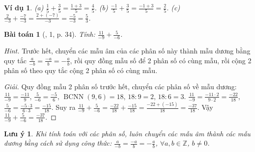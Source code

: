 \documentclass{article}
\newtheorem{baitoan}{Bài toán}
\newtheorem{luuy}{Lưu ý}
\newtheorem{vidu}{Ví dụ}
\begin{document}
\begin{vidu}
	(a) $\frac{1}{5} + \frac{3}{5} = \frac{1 + 3}{5} = \frac{4}{5}$. (b) $\frac{-1}{5} + \frac{3}{5} = \frac{-1 + 3}{5} = \frac{2}{5}$. (c) $\frac{2}{-3} + \frac{-7}{-3} = \frac{2 + (-7)}{-3} = \frac{-5}{-3} = \frac{5}{3}$.
\end{vidu}

\begin{baitoan}[\cite{SGK_Toan_6_Canh_Dieu_tap_2}, 1, p. 34]
	Tính: $\frac{11}{-9} + \frac{5}{-6}$.
\end{baitoan}
\noindent\textit{Hint.} Trước hết, chuyển các mẫu âm của các phân số này thành mẫu dương bằng quy tắc $\frac{a}{-b} = \frac{-a}{b} = -\frac{a}{b}$, rồi quy đồng mẫu số để 2 phân số có cùng mẫu, rồi cộng 2 phân số theo quy tắc cộng 2 phân số có cùng mẫu.

\begin{proof}[Giải]
	Quy đồng mẫu 2 phân số trước hết, chuyển các phân số về mẫu dương: $\frac{11}{-9} = \frac{-11}{9}$, $\frac{5}{-6} = \frac{-5}{6}$, $\operatorname{BCNN}(9,6) = 18$, $18:9 = 2$, $18:6 = 3$. $\frac{11}{-9} = \frac{-11\cdot2}{9\cdot2} = \frac{-22}{18}$, $\frac{5}{-6} = \frac{-5\cdot3}{6\cdot3} = \frac{-15}{18}$. Suy ra $\frac{11}{-9} + \frac{5}{-6} = \frac{-22}{18} + \frac{-15}{18} = \frac{-22 + (-15)}{18} = \frac{-37}{18}$. Vậy $\frac{11}{-9} + \frac{5}{-6} = \frac{-37}{18}$.
\end{proof}

\begin{luuy}
	Khi tính toán với các phân số, luôn chuyển các mẫu âm thành các mẫu dương bằng cách sử dụng công thức: $\frac{a}{-b} = \frac{-a}{b} = -\frac{a}{b}$, $\forall a,b\in\mathbb{Z}$, $b\ne0$.
\end{luuy}
\end{document}
